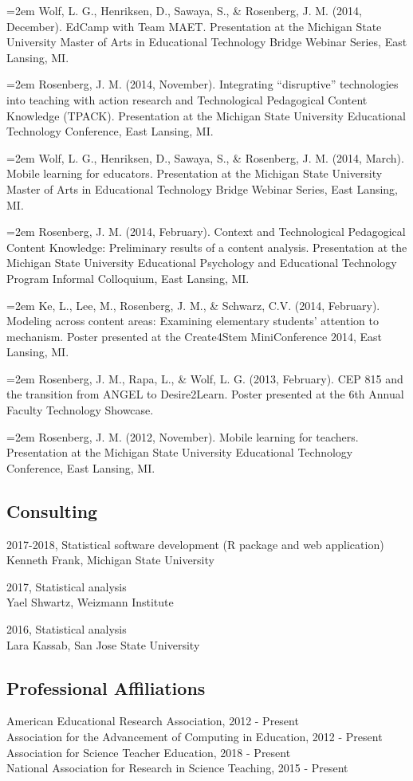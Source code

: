 \documentclass[14,]{article}
\begin{document}
\hangindent=2em Wolf, L. G., Henriksen, D., Sawaya, S., \& Rosenberg, J.
M. (2014, December). EdCamp with Team MAET. Presentation at the Michigan
State University Master of Arts in Educational Technology Bridge Webinar
Series, East Lansing, MI.

\hangindent=2em Rosenberg, J. M. (2014, November). Integrating
``disruptive'' technologies into teaching with action research and
Technological Pedagogical Content Knowledge (TPACK). Presentation at the
Michigan State University Educational Technology Conference, East
Lansing, MI.

\hangindent=2em Wolf, L. G., Henriksen, D., Sawaya, S., \& Rosenberg, J.
M. (2014, March). Mobile learning for educators. Presentation at the
Michigan State University Master of Arts in Educational Technology
Bridge Webinar Series, East Lansing, MI.

\hangindent=2em Rosenberg, J. M. (2014, February). Context and
Technological Pedagogical Content Knowledge: Preliminary results of a
content analysis. Presentation at the Michigan State University
Educational Psychology and Educational Technology Program Informal
Colloquium, East Lansing, MI.

\hangindent=2em Ke, L., Lee, M., Rosenberg, J. M., \& Schwarz, C.V.
(2014, February). Modeling across content areas: Examining elementary
students' attention to mechanism. Poster presented at the Create4Stem
MiniConference 2014, East Lansing, MI.

\hangindent=2em Rosenberg, J. M., Rapa, L., \& Wolf, L. G. (2013,
February). CEP 815 and the transition from ANGEL to Desire2Learn. Poster
presented at the 6th Annual Faculty Technology Showcase.

\hangindent=2em Rosenberg, J. M. (2012, November). Mobile learning for
teachers. Presentation at the Michigan State University Educational
Technology Conference, East Lansing, MI.

\subsection{Consulting}\label{consulting}

2017-2018, Statistical software development (R package and web
application)\\
Kenneth Frank, Michigan State University

2017, Statistical analysis\\
Yael Shwartz, Weizmann Institute

2016, Statistical analysis\\
Lara Kassab, San Jose State University

\subsection{Professional Affiliations}\label{professional-affiliations}

American Educational Research Association, 2012 - Present\\
Association for the Advancement of Computing in Education, 2012 -
Present\\
Association for Science Teacher Education, 2018 - Present\\
National Association for Research in Science Teaching, 2015 - Present
\end{document}
